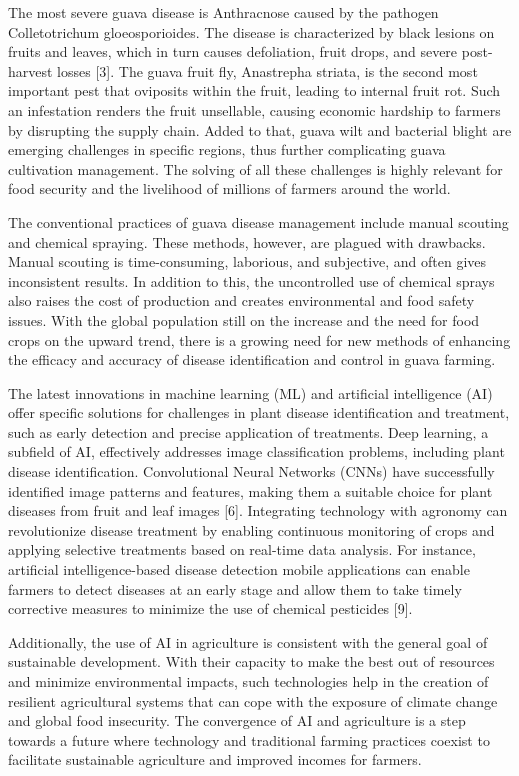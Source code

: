 \documentclass[conference]{IEEEtran}
\begin{document}
The most severe guava disease is Anthracnose caused by the pathogen Colletotrichum gloeosporioides. The disease is characterized by black lesions on fruits and leaves, which in turn causes defoliation, fruit drops, and severe post-harvest losses [3]. The guava fruit fly, Anastrepha striata, is the second most important pest that oviposits within the fruit, leading to internal fruit rot. Such an infestation renders the fruit unsellable, causing economic hardship to farmers by disrupting the supply chain. Added to that, guava wilt and bacterial blight are emerging challenges in specific regions, thus further complicating guava cultivation management. The solving of all these challenges is highly relevant for food security and the livelihood of millions of farmers around the world.

The conventional practices of guava disease management include manual scouting and chemical spraying. These methods, however, are plagued with drawbacks. Manual scouting is time-consuming, laborious, and subjective, and often gives inconsistent results. In addition to this, the uncontrolled use of chemical sprays also raises the cost of production and creates environmental and food safety issues. With the global population still on the increase and the need for food crops on the upward trend, there is a growing need for new methods of enhancing the efficacy and accuracy of disease identification and control in guava farming.

The latest innovations in machine learning (ML) and artificial intelligence (AI) offer specific solutions for challenges in plant disease identification and treatment, such as early detection and precise application of treatments. Deep learning, a subfield of AI, effectively addresses image classification problems, including plant disease identification. Convolutional Neural Networks (CNNs) have successfully identified image patterns and features, making them a suitable choice for plant diseases from fruit and leaf images [6]. Integrating technology with agronomy can revolutionize disease treatment by enabling continuous monitoring of crops and applying selective treatments based on real-time data analysis. For instance, artificial intelligence-based disease detection mobile applications can enable farmers to detect diseases at an early stage and allow them to take timely corrective measures to minimize the use of chemical pesticides [9].

Additionally, the use of AI in agriculture is consistent with the general goal of sustainable development. With their capacity to make the best out of resources and minimize environmental impacts, such technologies help in the creation of resilient agricultural systems that can cope with the exposure of climate change and global food insecurity. The convergence of AI and agriculture is a step towards a future where technology and traditional farming practices coexist to facilitate sustainable agriculture and improved incomes for farmers.
\end{document}
